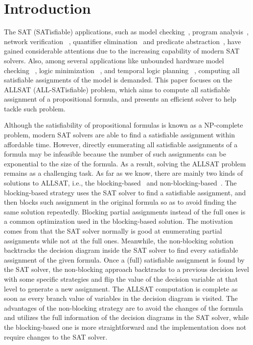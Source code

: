 \section{Introduction}
The SAT (SATisfiable) applications, such as model checking~\cite{bmc,ic3}, program analysis~\cite{klee,cpachecker,cbmc}, network verification ~\cite{lopes2015checking,majumdar2014kuai,zhang2012verification}, quantifier elimination~\cite{brauer2011existential} and predicate abstraction~\cite{lahiri2003symbolic}, have gained considerable attentions due to the increasing capability of modern SAT solvers. 
Also, among several applications like unbounded hardware model checking ~\cite{car}, logic minimization ~\cite{sapra2003sat}, and temporal logic planning ~\cite{aalta}, computing all satisfiable assignments of the model is demanded. This paper focuses on the ALLSAT (ALL-SATisfiable) problem, which aims to compute all satisfiable assignment of a propositional formula, and presents an efficient solver \tool to help tackle such problem.

Although the satisfiability of propositional formulas is known as a NP-complete problem, modern SAT solvers are able to find a satisfiable assignment within affordable time. However, directly enumerating all satisfiable assignments of a formula may be infeasible because the number of such assignments can be exponential to the size of the formula. As a result, solving the ALLSAT problem remains as a challenging task. As far as we know, there are mainly two kinds of solutions to ALLSAT, i.e., the blocking-based~\cite{mcmillan2002applying} and non-blocking-based~\cite{grumberg2004memory}. The blocking-based strategy uses the SAT solver to find a satisfiable assignment, and then blocks such assignment in the original formula so as to avoid finding the same solution repeatedly. Blocking partial assignments instead of the full ones is a common optimization used in the blocking-based solution. The motivation comes from that the SAT solver normally is good at enumerating partial assignments while not at the full ones. 
Meanwhile, the non-blocking solution backtracks the decision diagram inside the SAT solver to find every satisfiable assignment of the given formula. Once a (full) satisfiable assignment is found by the SAT solver, the non-blocking approach backtracks to a previous decision level with some specific strategies and flip the value of the decision variable at that level to generate a new assignment. The ALLSAT computation is complete as soon as every branch value of variables in the decision diagram is visited. 
The advantages of the non-blocking strategy are to avoid the changes of the formula and utilizes the full information of the decision diagrams in the SAT solver, while the blocking-based one is more straightforward and the implementation does not require changes to the SAT solver.

